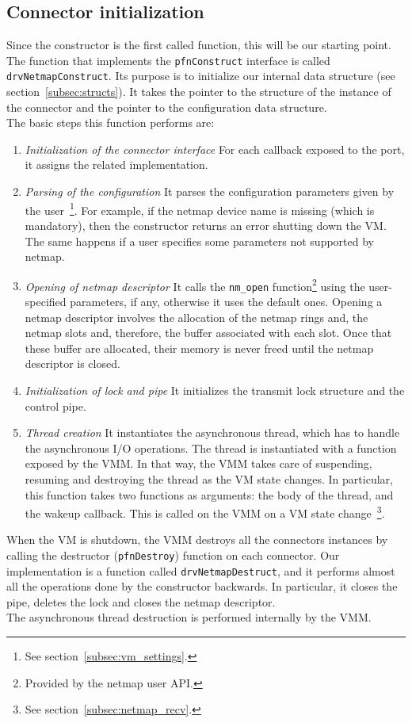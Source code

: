 \documentclass[a4paper, 12pt, titlepage]{report}
\begin{document}
\subsection{Connector initialization} \label{subsec:netmap_init}
Since the constructor is the first called function, this will be our starting point. The function that implements the \texttt{pfnConstruct} interface is called \texttt{drvNetmapConstruct}. Its purpose is to initialize our internal data structure (see section~\ref{subsec:structs}). It takes the pointer to the structure of the instance of the connector and the pointer to the configuration data structure.
\\
The basic steps this function performs are:
\begin{enumerate}
\item \textit{Initialization of the connector interface} For each callback exposed to the port, it assigns the related implementation.
\item \textit{Parsing of the configuration} It parses the configuration parameters given by the user~\footnote{See section~\ref{subsec:vm_settings}.}. For example, if the netmap device name is missing (which is mandatory), then the constructor returns an error shutting down the VM. The same happens if a user specifies some parameters not supported by netmap.
\item \textit{Opening of netmap descriptor} It calls the \texttt{nm\_open} function\footnote{Provided by the netmap user API.} using the user-specified parameters, if any, otherwise it uses the default ones. Opening a netmap descriptor involves the allocation of the netmap rings and, the netmap slots and, therefore, the buffer associated with each slot. Once that these buffer are allocated, their memory is never freed until the netmap descriptor is closed.
\item \textit{Initialization of lock and pipe} It initializes the transmit lock structure and the control pipe.
\item \textit{Thread creation} It instantiates the asynchronous thread, which has to handle the asynchronous I/O operations. The thread is instantiated with a function exposed by the VMM. In that way, the VMM takes care of suspending, resuming and destroying the thread as the VM state changes. In particular, this function takes two functions as arguments: the body of the thread, and the wakeup callback. This is called on the VMM on a VM state change~\footnote{See section~\ref{subsec:netmap_recv}.}. 
\end{enumerate}
When the VM is shutdown, the VMM destroys all the connectors instances by calling the destructor (\texttt{pfnDestroy}) function on each connector. Our implementation is a function called \texttt{drvNetmapDestruct}, and it performs almost all the operations done by the constructor backwards. In particular, it closes the pipe, deletes the lock and closes the netmap descriptor.
\\
The asynchronous thread destruction is performed internally by the VMM.
\end{document}
